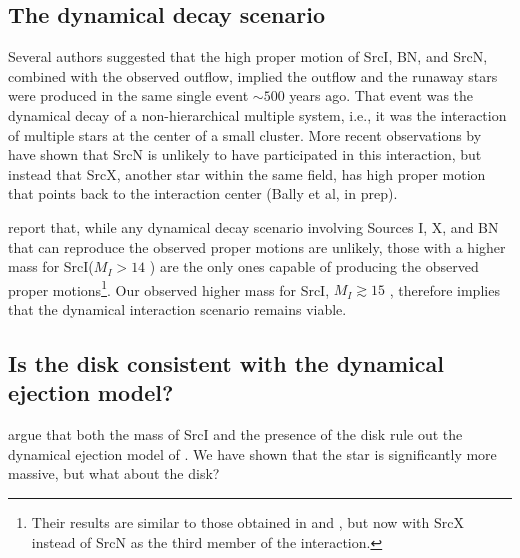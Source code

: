 \documentclass[twocolumn]{aastex61}
\newcommand{\sourcei}{SrcI\xspace}
\newcommand{\sourcen}{SrcN\xspace}
\newcommand{\sourcex}{SrcX\xspace}
\begin{document}
\subsection{The dynamical decay scenario}
Several authors \citep[][]{Gomez2008a,Goddi2011b,Bally2011a} suggested that
the high proper
motion of \sourcei, BN, and \sourcen, combined with the observed \hh outflow,
implied the outflow and the runaway stars were produced in the same single
event $\sim500$ years ago.  That event was the dynamical decay of a
non-hierarchical multiple system, i.e., it was the interaction of multiple
stars at the center of a small cluster.  More recent observations by
\citet{Luhman2017a} have shown that \sourcen is unlikely to have participated
in this interaction, but instead that \sourcex, another star within the same
field, has high proper motion that points back to the interaction center (Bally et al,
in prep).

\citet{Farias2017b} report that, while any dynamical decay scenario involving
Sources I, X, and BN that can reproduce the observed proper motions are
unlikely, those with a higher mass for \sourcei ($M_I>14$ \msun) are the only
ones capable of producing the observed proper motions\footnote{Their results
are similar to those obtained in \citet{Goddi2011b} and \citet{Moeckel2012b},
but now with \sourcex instead of \sourcen as the third member of the
interaction.}.  Our observed higher mass for \sourcei, $M_I\gtrsim15$ \msun,
therefore implies that the
dynamical interaction scenario remains viable.



\subsection{Is the disk consistent with the dynamical ejection model?}
\citet{Plambeck2016a} argue that both the mass of \sourcei and the presence of
the disk rule out the dynamical ejection model of \citet{Bally2011a}.  We have
shown that the star is significantly more massive, but what about the disk?
\end{document}
